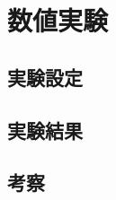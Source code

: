 \chapter{数値実験}
\label{chap:experiments}

\section{実験設定}
\label{sec:setup}

\section{実験結果}
\label{sec:results}

\section{考察}
\label{sec:discussion}
